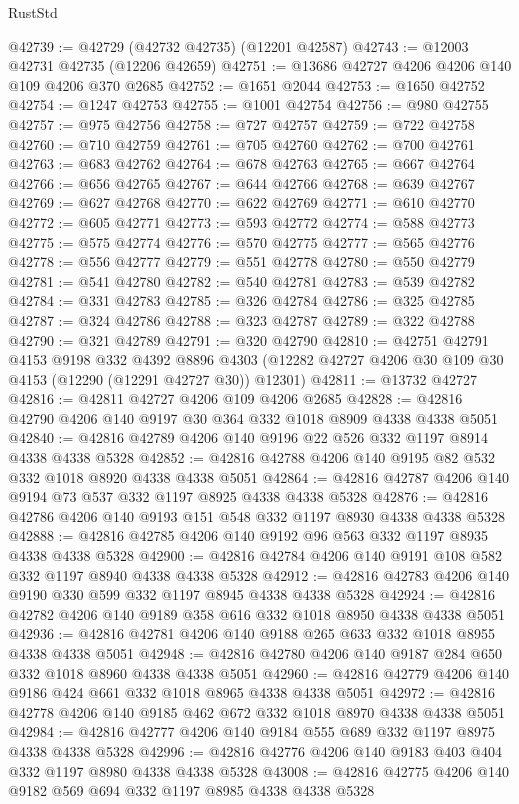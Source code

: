 \begin{lexlean}{RustStd}
\begin{coremodule}
{\begin{coremodule}
{{{{{{{{{{{{{{{{{{{{{{{{{{{{{{{{{{{{{{{{{{{{{{{{{{@42739 := @42729 (@42732 @42735) (@12201 @42587)
@42743 := @12003 @42731 @42735 (@12206 @42659)
@42751 := @13686 @42727 @4206 @4206 @140 @109 @4206 @370 @2685
@42752 := @1651 @2044
@42753 := @1650 @42752
@42754 := @1247 @42753
@42755 := @1001 @42754
@42756 := @980 @42755
@42757 := @975 @42756
@42758 := @727 @42757
@42759 := @722 @42758
@42760 := @710 @42759
@42761 := @705 @42760
@42762 := @700 @42761
@42763 := @683 @42762
@42764 := @678 @42763
@42765 := @667 @42764
@42766 := @656 @42765
@42767 := @644 @42766
@42768 := @639 @42767
@42769 := @627 @42768
@42770 := @622 @42769
@42771 := @610 @42770
@42772 := @605 @42771
@42773 := @593 @42772
@42774 := @588 @42773
@42775 := @575 @42774
@42776 := @570 @42775
@42777 := @565 @42776
@42778 := @556 @42777
@42779 := @551 @42778
@42780 := @550 @42779
@42781 := @541 @42780
@42782 := @540 @42781
@42783 := @539 @42782
@42784 := @331 @42783
@42785 := @326 @42784
@42786 := @325 @42785
@42787 := @324 @42786
@42788 := @323 @42787
@42789 := @322 @42788
@42790 := @321 @42789
@42791 := @320 @42790
@42810 := @42751
    @42791
    @4153
    @9198
    @332
    @4392
    @8896
    @4303
    (@12282 @42727 @4206 @30 @109 @30 @4153 (@12290 (@12291 @42727 @30)) @12301)
@42811 := @13732 @42727
@42816 := @42811 @42727 @4206 @109 @4206 @2685
@42828 := @42816 @42790 @4206 @140 @9197 @30 @364 @332 @1018 @8909 @4338 @4338 @5051
@42840 := @42816 @42789 @4206 @140 @9196 @22 @526 @332 @1197 @8914 @4338 @4338 @5328
@42852 := @42816 @42788 @4206 @140 @9195 @82 @532 @332 @1018 @8920 @4338 @4338 @5051
@42864 := @42816 @42787 @4206 @140 @9194 @73 @537 @332 @1197 @8925 @4338 @4338 @5328
@42876 := @42816 @42786 @4206 @140 @9193 @151 @548 @332 @1197 @8930 @4338 @4338 @5328
@42888 := @42816 @42785 @4206 @140 @9192 @96 @563 @332 @1197 @8935 @4338 @4338 @5328
@42900 := @42816 @42784 @4206 @140 @9191 @108 @582 @332 @1197 @8940 @4338 @4338 @5328
@42912 := @42816 @42783 @4206 @140 @9190 @330 @599 @332 @1197 @8945 @4338 @4338 @5328
@42924 := @42816 @42782 @4206 @140 @9189 @358 @616 @332 @1018 @8950 @4338 @4338 @5051
@42936 := @42816 @42781 @4206 @140 @9188 @265 @633 @332 @1018 @8955 @4338 @4338 @5051
@42948 := @42816 @42780 @4206 @140 @9187 @284 @650 @332 @1018 @8960 @4338 @4338 @5051
@42960 := @42816 @42779 @4206 @140 @9186 @424 @661 @332 @1018 @8965 @4338 @4338 @5051
@42972 := @42816 @42778 @4206 @140 @9185 @462 @672 @332 @1018 @8970 @4338 @4338 @5051
@42984 := @42816 @42777 @4206 @140 @9184 @555 @689 @332 @1197 @8975 @4338 @4338 @5328
@42996 := @42816 @42776 @4206 @140 @9183 @403 @404 @332 @1197 @8980 @4338 @4338 @5328
@43008 := @42816 @42775 @4206 @140 @9182 @569 @694 @332 @1197 @8985 @4338 @4338 @5328
}}}}}}}}}}}}}}}}}}}}}}}}}}}}}}}}}}}}}}}}}}}}}}}}}}
\end{coremodule}}
\end{coremodule}
\end{lexlean}

